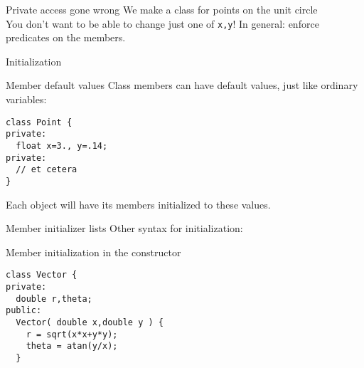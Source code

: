 \begin{block}{Private access gone wrong}
  \label{sl:privatenogood}
  We make a class for points on the unit circle\\
  You don't want to be able to change just one of \lstinline{x,y}!
  In general: enforce predicates on the members.
\end{block}

\begin{comment}
  In the first example above, the data members of the \lstinline{Vector} class were
  declared \lstinline{public}, meaning that they are accessable from the calling
  (main) program. While this is initially convenient for coding, it is a bad idea
  in the long term. For a variety of reasons it is good practice to
  separate interface and implementation of a class.

  \begin{block}{Example of accessor functions}
    \label{sl:pointaccess}
    Getting and setting of members values is done through accessor functions:
    \begin{multicols}{2}
      \verbatimsnippet{pointprivate}
      \verbatimsnippet{pointprivateset}
      \verbatimsnippet{pointprivateclose}
      \verbatimsnippet{pointprivatedefine}
    \end{multicols}
    Usage:
    \verbatimsnippet{pointprivatesetuse}
  \end{block}
\end{comment}

 {Initialization}

\begin{block}{Member default values}
  \label{sl:class-defval}
  Class members can have default values, just like ordinary variables:
\begin{lstlisting}
class Point {
private:
  float x=3., y=.14;
private:
  // et cetera
}
\end{lstlisting}
  Each object will have its members initialized to these values.
\end{block}

\begin{block}{Member initializer lists}
  \label{sl:class-init}
  Other syntax for initialization:
\end{block}

\begin{block}{Member initialization in the constructor}
  \label{sl:class-set}
\begin{lstlisting}
class Vector {
private:
  double r,theta;
public:
  Vector( double x,double y ) {
    r = sqrt(x*x+y*y);
    theta = atan(y/x);
  }
\end{lstlisting}
\end{block}

